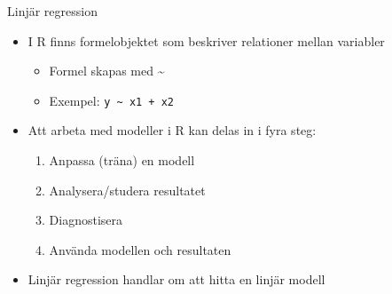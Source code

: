 \documentclass[
  11pt,
  ignorenonframetext,
  handout]{beamer}
\providecommand{\tightlist}{%
  \setlength{\itemsep}{0pt}\setlength{\parskip}{0pt}}
\begin{document}
\begin{frame}[fragile]{Linjär regression}
\label{linjuxe4r-regression-1}
\begin{itemize}
\tightlist
\item
  I R finns formelobjektet som beskriver relationer mellan variabler

  \begin{itemize}
  \tightlist
  \item
    Formel skapas med \textasciitilde{}
  \item
    Exempel: \texttt{y\ \textasciitilde{}\ x1\ +\ x2}
  \end{itemize}
\item
  Att arbeta med modeller i R kan delas in i fyra steg:

  \begin{enumerate}
  \tightlist
  \item
    Anpassa (träna) en modell
  \item
    Analysera/studera resultatet
  \item
    Diagnostisera
  \item
    Använda modellen och resultaten
  \end{enumerate}
\item
  Linjär regression handlar om att hitta en linjär modell
\end{itemize}
\end{frame}
\end{document}

